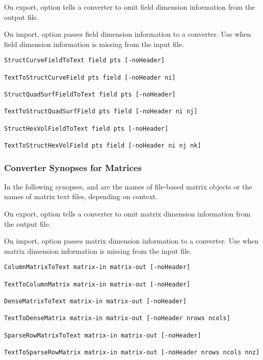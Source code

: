 On export, option  tells a converter to omit
field dimension information from the output file.

On import, option  passes field dimension
information to a converter. Use  when field
dimension information is missing from the input file.

\begin{verbatim}
StructCurveFieldToText field pts [-noHeader]

TextToStructCurveField pts field [-noHeader ni]

StructQuadSurfFieldToText field pts [-noHeader]

TextToStructQuadSurfField pts field [-noHeader ni nj]

StructHexVolFieldToText field pts [-noHeader]

TextToStructHexVolField pts field [-noHeader ni nj nk]

\end{verbatim}

\subsubsection{Converter Synopses for Matrices}

In the following synopses,  and 
are the names of \sr{} file-based matrix objects or the names
of matrix text files, depending on context.

On export, option  tells a converter to omit matrix
dimension information from the output file.

On import, option  passes matrix dimension
information to a converter.  Use  when matrix
dimension information is missing from the input file.

\begin{verbatim}
ColumnMatrixToText matrix-in matrix-out [-noHeader]

TextToColumnMatrix matrix-in matrix-out [-noHeader]

DenseMatrixToText matrix-in matrix-out [-noHeader]

TextToDenseMatrix matrix-in matrix-out [-noHeader nrows ncols]

SparseRowMatrixToText matrix-in matrix-out [-noHeader]

TextToSparseRowMatrix matrix-in matrix-out [-noHeader nrows ncols nnz]
\end{verbatim}

